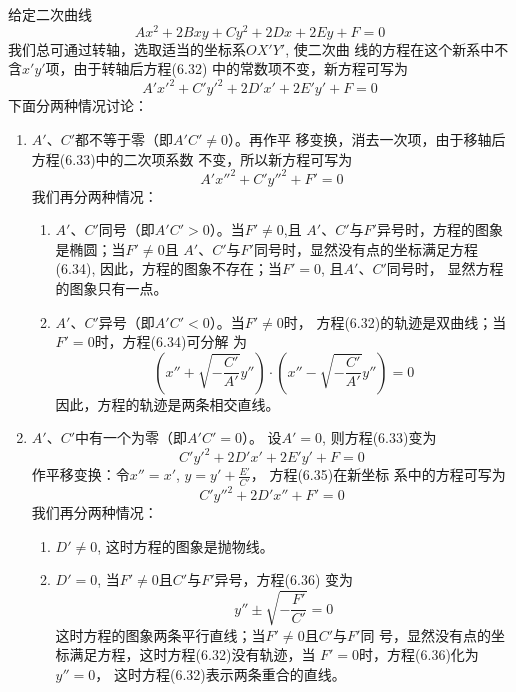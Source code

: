 给定二次曲线
\begin{equation}
 Ax^2+2Bxy+Cy^2+2Dx+2Ey+F=0   
\end{equation}
我们总可通过转轴，选取适当的坐标系$OX'Y'$, 使二次曲
线的方程在这个新系中不含$x'y'$项，由于转轴后方程(6.32)
中的常数项不变，新方程可写为
\begin{equation}
    A'{x'}^2+C'{y'}^2+2D'x'+2E'y'+F=0
\end{equation}
下面分两种情况讨论：
\begin{enumerate}
    \item $A'$、$C'$都不等于零（即$A'C'\ne 0$）。再作平
移变换，消去一次项，由于移轴后方程(6.33)中的二次项系数
不变，所以新方程可写为
\begin{equation}
    A'{x''}^2+C'{y''}^2+F'=0
\end{equation}
我们再分两种情况：
\begin{enumerate}
\item $A'$、$C'$同号（即$A'C'>0$）。当$F'\ne 0$,且
$A'$、$C'$与$F'$异号时，方程的图象是椭圆；当$F'\ne 0$且
$A'$、$C'$与$F'$同号时，显然没有点的坐标满足方程(6.34), 
因此，方程的图象不存在；当$F'= 0$, 且$A'$、$C'$同号时，
显然方程的图象只有一点。
\item $A'$、$C'$异号（即$A'C'<0$）。当$F'\ne 0$时，
方程(6.32)的轨迹是双曲线；当$F'= 0$时，方程(6.34)可分解
为
\[\left(x''+\sqrt{-\frac{C'}{A'}}y''\right)\cdot \left(x''-\sqrt{-\frac{C'}{A'}}y''\right)=0\]
因此，方程的轨迹是两条相交直线。
\end{enumerate}
\item $A'$、$C'$中有一个为零（即$A'C'=0$）。
设$A'=0$, 则方程(6.33)变为
\begin{equation}
    C'{y'}^2+2D'x'+2E'y'+F=0
\end{equation}
作平移变换：令$x''=x'$, $y=y'+\frac{E'}{C'}$，
方程(6.35)在新坐标
系中的方程可写为
\begin{equation}
    C'{y''}^2+2D'x''+F'=0
\end{equation}
我们再分两种情况：
\begin{enumerate}
    \item $D'\ne 0$, 这时方程的图象是抛物线。
    \item $D'=0$, 当$F'\ne 0$且$C'$与$F'$异号，方程(6.36)
    变为
    \[y''\pm \sqrt{-\frac{F'}{C'}}=0\]
    这时方程的图象两条平行直线；当$F'\ne 0$且$C'$与$F'$同
号，显然没有点的坐标满足方程，这时方程(6.32)没有轨迹，当
$F'=0$时，方程(6.36)化为$y''=0$，
这时方程(6.32)表示两条重合的直线。
\end{enumerate}
\end{enumerate}


